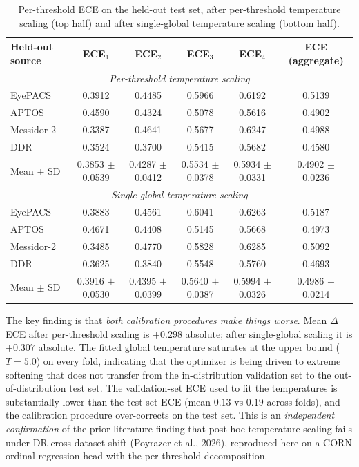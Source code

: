 \documentclass[11pt]{article}
\begin{document}
\begin{table}[ht]
\centering
\begin{tabular}{lccccc}
\toprule
Held-out source & ECE$_1$ & ECE$_2$ & ECE$_3$ & ECE$_4$ & ECE (aggregate) \\
\midrule
\multicolumn{6}{c}{\textit{Per-threshold temperature scaling}} \\
\midrule
EyePACS    & 0.3912 & 0.4485 & 0.5966 & 0.6192 & 0.5139 \\
APTOS      & 0.4590 & 0.4324 & 0.5078 & 0.5616 & 0.4902 \\
Messidor-2 & 0.3387 & 0.4641 & 0.5677 & 0.6247 & 0.4988 \\
DDR        & 0.3524 & 0.3700 & 0.5415 & 0.5682 & 0.4580 \\
\midrule
Mean $\pm$ SD & 0.3853 $\pm$ 0.0539 & 0.4287 $\pm$ 0.0412 & 0.5534 $\pm$ 0.0378 & 0.5934 $\pm$ 0.0331 & 0.4902 $\pm$ 0.0236 \\
\midrule
\multicolumn{6}{c}{\textit{Single global temperature scaling}} \\
\midrule
EyePACS    & 0.3883 & 0.4561 & 0.6041 & 0.6263 & 0.5187 \\
APTOS      & 0.4671 & 0.4408 & 0.5145 & 0.5668 & 0.4973 \\
Messidor-2 & 0.3485 & 0.4770 & 0.5828 & 0.6285 & 0.5092 \\
DDR        & 0.3625 & 0.3840 & 0.5548 & 0.5760 & 0.4693 \\
\midrule
Mean $\pm$ SD & 0.3916 $\pm$ 0.0530 & 0.4395 $\pm$ 0.0399 & 0.5640 $\pm$ 0.0387 & 0.5994 $\pm$ 0.0326 & 0.4986 $\pm$ 0.0214 \\
\bottomrule
\end{tabular}
\caption{Per-threshold ECE on the held-out test set, after per-threshold temperature scaling (top half) and after single-global temperature scaling (bottom half).}
\label{tab:cal-ece}
\end{table}

The key finding is that \emph{both calibration procedures make things worse}. Mean $\Delta$ECE after per-threshold scaling is $+0.298$ absolute; after single-global scaling it is $+0.307$ absolute. The fitted global temperature saturates at the upper bound ($T = 5.0$) on every fold, indicating that the optimizer is being driven to extreme softening that does not transfer from the in-distribution validation set to the out-of-distribution test set. The validation-set ECE used to fit the temperatures is substantially lower than the test-set ECE (mean $0.13$ vs $0.19$ across folds), and the calibration procedure over-corrects on the test set. This is an \emph{independent confirmation} of the prior-literature finding that post-hoc temperature scaling fails under DR cross-dataset shift (Poyrazer et al., 2026), reproduced here on a CORN ordinal regression head with the per-threshold decomposition.
\end{document}
